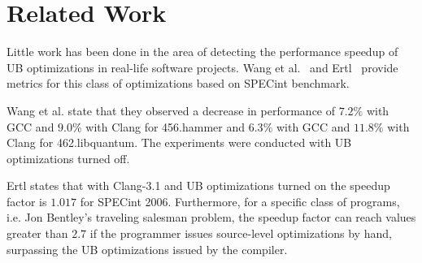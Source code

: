 \section{Related Work} \label{sec:rl}

Little work has been done in the area of detecting the performance
speedup of UB optimizations in real-life software projects. Wang et
al.~\cite{wang2012undefined} and Ertl~\cite{ertl2015every} provide
metrics for this class of optimizations based on SPECint benchmark.

Wang et al. state that they observed a decrease in performance of $7.2\%$
with GCC and $9.0\%$ with Clang for 456.hammer and $6.3\%$ with GCC and
$11.8\%$ with Clang for 462.libquantum. The experiments were conducted
with UB optimizations turned off.

Ertl states that with Clang-3.1 and UB optimizations turned on the
speedup factor is $1.017$ for SPECint 2006. Furthermore, for a specific
class of programs, i.e. Jon Bentley's traveling salesman problem, the
speedup factor can reach values greater than $2.7$ if the programmer
issues source-level optimizations by hand, surpassing the UB
optimizations issued by the compiler.
